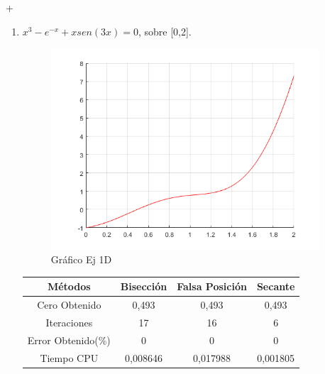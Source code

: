 +\documentclass{udpreport}
\begin{document}
\begin{enumerate}
\begin{enumerate}
    \item \(x^3- e^{-x} +xsen(3x) = 0 \), sobre [0,2].\\
        
        \begin{figure}[H]
        \centering
        \includegraphics[width=10cm]{ec4.png}
        \caption{Gráfico Ej 1D}
        \end{figure}
        \begin{table}[H]
        \centering
           \begin{tabular} { |c|c|c|c|}
                \hline
                Métodos       & Bisección & Falsa Posición & Secante  \\
                \hline
                Cero Obtenido &  0,493      &    0,493     &      0,493   \\
                \hline
                Iteraciones   &   17        &    16     &      6     \\
                \hline
                Error Obtenido(\%) &       0      &       0      &     0         \\
                \hline
                Tiempo CPU &      0,008646     &      0,017988    &     0,001805         \\
                 \hline
                \end{tabular}
            \end{table}
        

\end{enumerate}
\end{enumerate}
\end{document}
